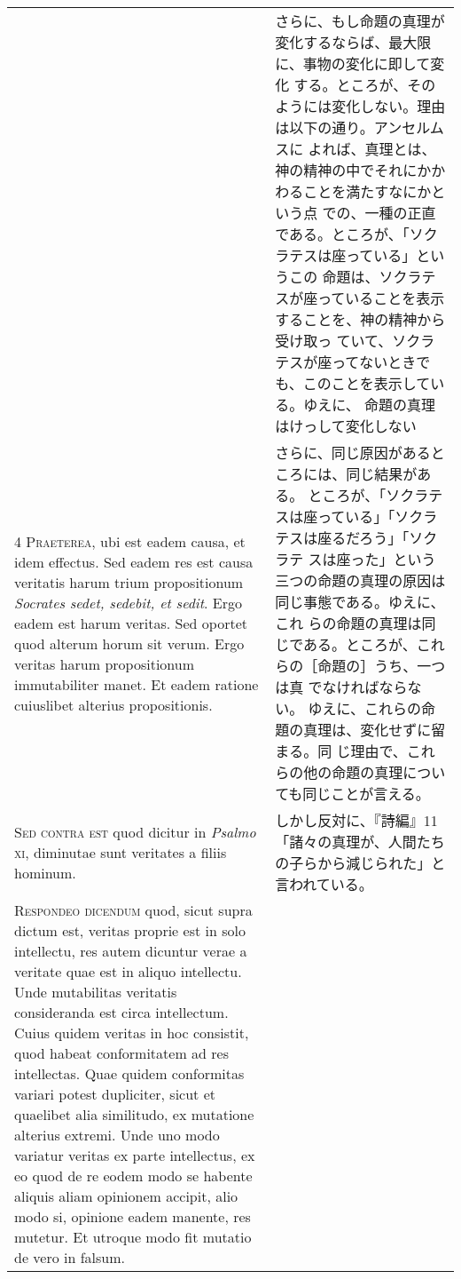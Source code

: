 \documentclass[10pt]{jsarticle} %
\begin{document}
\begin{longtable}{p{21em}p{21em}}
&

さらに、もし命題の真理が変化するならば、最大限に、事物の変化に即して変化
 する。ところが、そのようには変化しない。理由は以下の通り。アンセルムスに
 よれば、真理とは、神の精神の中でそれにかかわることを満たすなにかという点
 での、一種の正直である。ところが、「ソクラテスは座っている」というこの
 命題は、ソクラテスが座っていることを表示することを、神の精神から受け取っ
 ていて、ソクラテスが座ってないときでも、このことを表示している。ゆえに、
 命題の真理はけっして変化しない


\\


{\scshape 4 Praeterea}, ubi est eadem causa, et
idem effectus. Sed eadem res est causa veritatis harum trium
propositionum {\itshape Socrates sedet, sedebit, et sedit}. Ergo eadem est harum
veritas. Sed oportet quod alterum horum sit verum. Ergo veritas harum
propositionum immutabiliter manet. Et eadem ratione cuiuslibet alterius
propositionis.

&

さらに、同じ原因があるところには、同じ結果がある。
ところが、「ソクラテスは座っている」「ソクラテスは座るだろう」「ソクラテ
 スは座った」という三つの命題の真理の原因は同じ事態である。ゆえに、これ
 らの命題の真理は同じである。ところが、これらの［命題の］うち、一つは真
 でなければならない。 ゆえに、これらの命題の真理は、変化せずに留まる。同
 じ理由で、これらの他の命題の真理についても同じことが言える。

\\


{\scshape Sed contra est} quod dicitur in
{\itshape Psalmo} {\scshape xi}, diminutae sunt veritates a filiis hominum.

&
しかし反対に、『詩編』11「諸々の真理が、人間たちの子らから減じられた」と
 言われている。


\\


{\scshape Respondeo dicendum} quod, sicut supra
dictum est, veritas proprie est in solo intellectu, res autem dicuntur
verae a veritate quae est in aliquo intellectu. Unde mutabilitas
veritatis consideranda est circa intellectum. Cuius quidem veritas in
hoc consistit, quod habeat conformitatem ad res intellectas. Quae quidem
conformitas variari potest dupliciter, sicut et quaelibet alia
similitudo, ex mutatione alterius extremi. Unde uno modo variatur
veritas ex parte intellectus, ex eo quod de re eodem modo se habente
aliquis aliam opinionem accipit, alio modo si, opinione eadem manente,
res mutetur. Et utroque modo fit mutatio de vero in falsum. 


\end{longtable}
\end{document}
